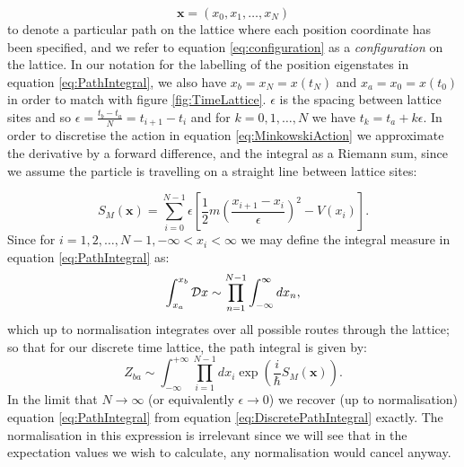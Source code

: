 \documentclass[12pt]{article}
\begin{document}
        \begin{equation}
            \label{eq:configuration}
            \bm{x}=\left(x_0,x_1,\dots,x_{N}\right)
        \end{equation}
        to denote a particular path on the lattice where each position coordinate has been specified, and we refer to equation \ref{eq:configuration} as a \textit{configuration} on the lattice. In our notation for the labelling of the position eigenstates in equation \ref{eq:PathIntegral}, we also have $x_b=x_{N}=x\left(t_{N}\right)$ and $x_a=x_0=x\left(t_0\right)$ in order to match with figure \ref{fig:TimeLattice}. $ \epsilon $ is the spacing between lattice sites and so $\epsilon = \frac{t_b-t_a}{N} = t_{i+1}-t_i$ and for $k=0,1,\dots,N$ we have $ t_k = t_a + k \epsilon $. In order to discretise the action in equation \ref{eq:MinkowskiAction} we approximate the derivative by a forward difference, and the integral as a Riemann sum, since we assume the particle is travelling on a straight line between lattice sites:
        
        \begin{equation}
            \label{eq:DiscreteMinkowskiAction}
            S_{M}\left(\bm{x}\right) = \sum_{i=0}^{N-1} \epsilon \left[\frac{1}{2}m\left(\frac{x_{i+1}-x_{i}}{\epsilon}\right)^{2} - V\left(x_i\right)\right].
        \end{equation}
        Since  for $i=1,2,\dots,N-1, -\infty < x_i < \infty$ we may define the integral measure in equation \ref{eq:PathIntegral} as:
        \begin{equation}
            \label{eq:IntegralMeasure}
            \int_{x_a}^{x_b} {\cal D} x \sim \prod_{n=1}^{N-1}\int_{-\infty}^{\infty}dx_n,
        \end{equation}
        which up to normalisation integrates over all possible routes through the lattice; so that for our discrete time lattice, the path integral is given by:
        \begin{equation}
            \label{eq:DiscretePathIntegral}
            Z_{ba} \sim \int^{+\infty}_{-\infty}\prod_{i=1}^{N-1}dx_i \exp{\left(\frac{i}{\hbar}S_M\left(\bm{x}\right)\right)}.
        \end{equation}
        In the limit that $N\rightarrow \infty$ (or equivalently $\epsilon \rightarrow 0$) we recover (up to normalisation) equation \ref{eq:PathIntegral} from equation \ref{eq:DiscretePathIntegral} exactly. The normalisation in this expression is irrelevant since we will see that in the expectation values we wish to calculate, any normalisation would cancel anyway.  
\end{document}
